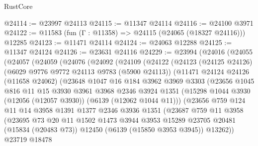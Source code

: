 \begin{lexlean}{RustCore}
\begin{coremodule}
@24114 := @23997 @24113
@24115 := @11347 @24114
@24116 := @24100 @3971
@24122 := @11583 (fun (Γ : @11358) => @24115 (@24065 (@18327 @24116))) @12285
@24123 := @11471 @24114
@24124 := @24063 @12288
@24125 := @11347 @24124
@24126 := @23631 @24116
@24229 := @23994
    (@24016
      (@24055
        (@24057
          (@24059
            (@24076
              (@24092
                (@24109
                  (@24122
                    (@24123
                      (@24125 @24126)
                      (@6029 @9776 @9772 @24113 @9783 (@5900 @24113))
                      (@11471
                        @24124
                        @24126
                        (@11658 @24062)
                        (@23648
                          @1047
                          @16
                          @184
                          @3962
                          @3969
                          @3303
                          (@23656
                            @1045
                            @816
                            @11
                            @15
                            @3930
                            @3961
                            @3968
                            @2346
                            @3924
                            @1351
                            (@15298 @1044 @3930 (@12056 (@12057 @3930)) (@6139 (@12062 @1044 @11)))
                            (@23656
                              @759
                              @124
                              @11
                              @14
                              @3958
                              @1391
                              @1377
                              @2346
                              @3936
                              @1351
                              (@23687
                                @759
                                @11
                                @3958
                                (@23695
                                  @73
                                  @20
                                  @11
                                  @1502
                                  @1473
                                  @3944
                                  @3953
                                  @15289
                                  @23705
                                  @20481
                                  (@15834 (@20483 @73))
                                  @12450
                                  (@6139 (@15850 @3953 @3945))
                                  @13262))
                              @23719
                              @18478

\end{coremodule}
\end{lexlean}
